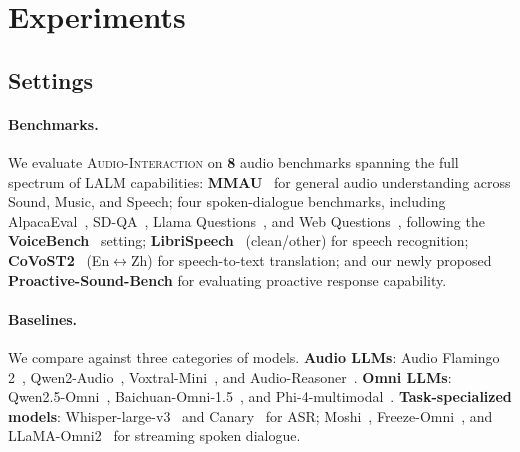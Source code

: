 \documentclass{article}
\begin{document}



\vspace{-2mm}
\section{Experiments}
\label{sec:experiments}
 \vspace{-2mm}
 
\subsection{Settings}
\label{sec:settings}
\vspace{-2mm}

\paragraph{Benchmarks.}
We evaluate \textsc{Audio-Interaction} on \textbf{8} audio benchmarks spanning the full spectrum of LALM capabilities: \textbf{MMAU}~\citep{sakshi2024mmau} for general audio understanding across Sound, Music, and Speech; four spoken-dialogue benchmarks, including AlpacaEval~\citep{dubois2023alpacafarm}, SD-QA~\citep{faisal2021sd}, Llama Questions~\citep{nachmani2023spoken}, and Web Questions~\citep{berant2013semantic}, following the \textbf{VoiceBench}~\citep{chen2026voicebench} setting; \textbf{LibriSpeech}~\citep{panayotov2015librispeech} (clean/other) for speech recognition; \textbf{CoVoST2}~\citep{wang2021covost} (En$\leftrightarrow$Zh) for speech-to-text translation; and our newly proposed \textbf{Proactive-Sound-Bench} for evaluating proactive response capability.

\vspace{-2mm}
\paragraph{Baselines.}
We compare against three categories of models. \textbf{Audio LLMs}: Audio Flamingo 2~\citep{ghosh2025audio}, Qwen2-Audio~\citep{chu2024qwen2}, Voxtral-Mini~\citep{liu2025voxtral}, and Audio-Reasoner~\citep{audio-reasoner}. \textbf{Omni LLMs}: Qwen2.5-Omni~\citep{qwen25omni2025}, Baichuan-Omni-1.5~\citep{li2025baichuan}, and Phi-4-multimodal~\citep{abouelenin2025phi}. \textbf{Task-specialized models}: Whisper-large-v3~\citep{radford2023whisper} and Canary~\citep{sekoyan2025canary} for ASR; Moshi~\citep{defossez2024moshi}, Freeze-Omni~\citep{wang2024freeze}, and LLaMA-Omni2~\citep{fang2025llama} for streaming spoken dialogue. 
\end{document}
